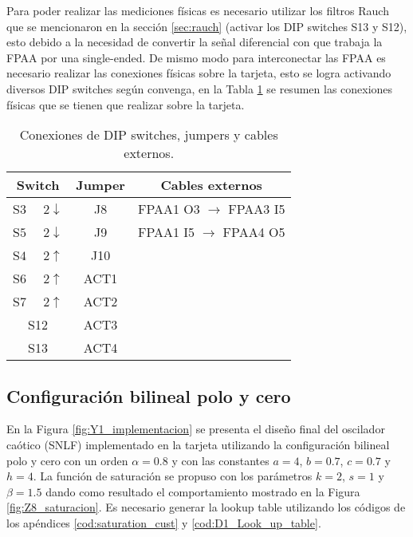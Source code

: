 	Para poder realizar las mediciones físicas es necesario utilizar los filtros Rauch que se mencionaron en la sección \ref{sec:rauch} (activar los DIP switches S13 y S12), esto debido a la necesidad de convertir la señal diferencial con que trabaja la FPAA por una single-ended. De mismo modo para interconectar las FPAA es necesario realizar las conexiones físicas sobre la tarjeta, esto se logra activando diversos DIP switches según convenga, en la Tabla \ref{tab:resumen_de_imp} se resumen las conexiones físicas que se tienen que realizar sobre la tarjeta. 
	
	\begin{table}[!ht]                                      
		\centering   
		\caption{Conexiones de DIP switches, jumpers y cables externos.}                            
		\label{tab:resumen_de_imp}                                       
			\begin{tabular}{c c c}                        
			\hline                                              
			Switch & Jumper & Cables externos\\            
			\hline       
			{\color{magenta} S$3$ $\quad2\downarrow$}& J8 & FPAA1 O3 $\rightarrow$ FPAA3 I5\\  
			{\color{magenta} S$5$ $\quad2\downarrow$}& J9& FPAA1 I5 $\rightarrow$ FPAA4 O5\\
			{\color{red} S$4$ $\quad2\uparrow$}&J10&\\ 
			{\color{red} S$6$ $\quad2\uparrow$}&ACT1 &\\
			{\color{blue} S$7$ $\quad2\uparrow$}& ACT2 &\\ 
			S12& ACT3 &\\ 
			S13& ACT4 &\\ 
			\hline                                 
			\end{tabular}                                                             
	\end{table}	
	
	\subsection{Configuración bilineal polo y cero}
	En la Figura \ref{fig:Y1_implementacion} se presenta el diseño final del oscilador caótico (SNLF) implementado en la tarjeta utilizando la configuración bilineal polo y cero con un  orden $\alpha = 0.8$ y con las constantes $a =4$, $b = 0.7$, $c = 0.7$ y $h = 4$. La función de saturación se propuso con los parámetros $k = 2$, $s = 1$ y $\beta= 1.5$ dando como resultado el comportamiento mostrado en la Figura \ref{fig:Z8_saturacion}. Es necesario generar la lookup table utilizando los códigos de los apéndices \ref{cod:saturation_cust} y \ref{cod:D1_Look_up_table}.
	
